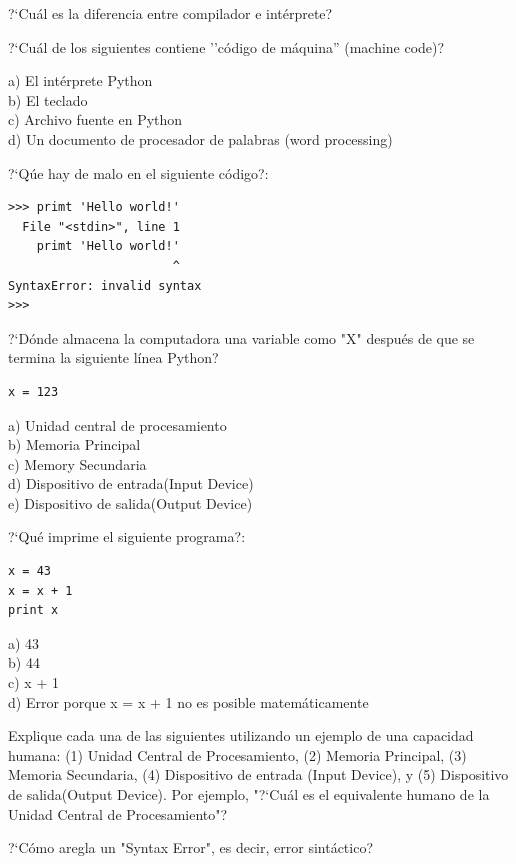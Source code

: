 \begin{ex}
?`Cu\'al es la diferencia entre compilador e int\'erprete?
\end{ex}

\begin{ex}
?`Cu\'al de los siguientes contiene ''c\'odigo de m\'aquina'' (machine code)?

a) El int\'erprete Python\\
b) El teclado\\
c) Archivo fuente en Python\\
d) Un documento de procesador de palabras (word processing)
\end{ex}

\begin{ex}
?`Q\'ue hay de malo en el siguiente c\'odigo?:

\beforeverb
\begin{verbatim}
>>> primt 'Hello world!'
  File "<stdin>", line 1
    primt 'Hello world!'
                       ^
SyntaxError: invalid syntax
>>> 
\end{verbatim}
\afterverb

\end{ex}

\begin{ex}
?`D\'onde almacena la computadora una variable como "X" despu\'es de que  
se termina la siguiente l\'inea Python?

\beforeverb
\begin{verbatim}
x = 123
\end{verbatim}
\afterverb
%
a) Unidad central de procesamiento\\
b) Memoria Principal\\
c) Memory Secundaria\\
d) Dispositivo de entrada(Input Device)\\
e) Dispositivo de salida(Output Device)
\end{ex}

\begin{ex}
?`Qu\'e imprime el siguiente programa?:

\beforeverb
\begin{verbatim}
x = 43
x = x + 1
print x
\end{verbatim}
\afterverb
%
a) 43\\
b) 44\\
c) x + 1\\
d) Error porque x = x + 1 no es posible matem\'aticamente
\end{ex}

\begin{ex}
Explique cada una de las siguientes utilizando un ejemplo de una capacidad humana: 
(1) Unidad Central de Procesamiento, (2) Memoria Principal, (3) Memoria Secundaria, 
(4) Dispositivo de entrada (Input Device), y 
(5) Dispositivo de salida(Output Device).
Por ejemplo, "?`Cu\'al es el equivalente humano de la Unidad Central de Procesamiento"? 
\end{ex}

\begin{ex}
?`C\'omo aregla un "Syntax Error", es decir, error sint\'actico?
\end{ex}
